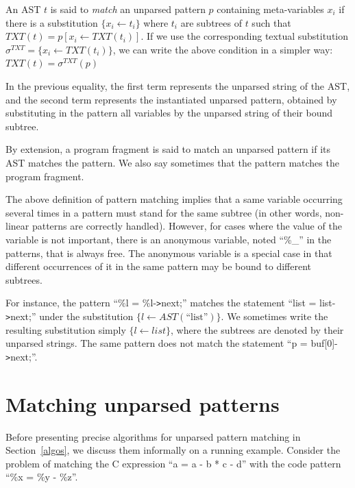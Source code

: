 \documentclass{sigplanconf}
\begin{document}
An AST $t$ is said to {\em match} an unparsed pattern $p$ containing
meta-variables $x_i$ if there is a substitution $\{x_i\gets t_i\}$
where $t_i$ are subtrees of $t$ such that $TXT(t) = p[x_i\gets
TXT(t_i)]$.  If we use the corresponding textual substitution
$\sigma^{TXT}=\{x_i\gets TXT(t_i)\}$, we can write the above condition
in a simpler way: $TXT(t) = \sigma^{TXT}(p)$

In the previous equality, the first term represents the unparsed
string of the AST, and the second term represents the instantiated
unparsed pattern, obtained by substituting in the pattern all
variables by the unparsed string of their bound subtree.

By extension, a program fragment is said to match an unparsed pattern
if its AST matches the pattern. We also say sometimes that
the pattern matches the program fragment.

The above definition of pattern matching implies that a same variable
occurring several times in a pattern must stand for the same subtree
(in other words, non-linear patterns are correctly handled). However,
for cases where the value of the variable is not important, there is
an anonymous variable, noted ``\%\_'' in the patterns, that is always
free. The anonymous variable is a special case in that different
occurrences of it in the same pattern may be bound to different
subtrees.

For instance, the pattern ``\%l = \%l-\verb.>.next;'' matches the
statement ``list = list-\verb.>.next;'' under the substitution
$\{l\gets AST(\mbox{``list''})\}$. We sometimes write the resulting
substitution simply $\{l\gets list\}$, where the subtrees are denoted
by their unparsed strings. The same pattern does not match the
statement ``p = buf[0]-\verb.>.next;''.


\section{Matching unparsed patterns}
\label{informal}
Before presenting precise algorithms for unparsed pattern matching in
Section~\ref{algos}, we discuss them informally on a running
example. Consider the problem of matching the C expression ``a = a - b
* c - d'' with the code pattern ``\%x = \%y - \%z''.
\end{document}
